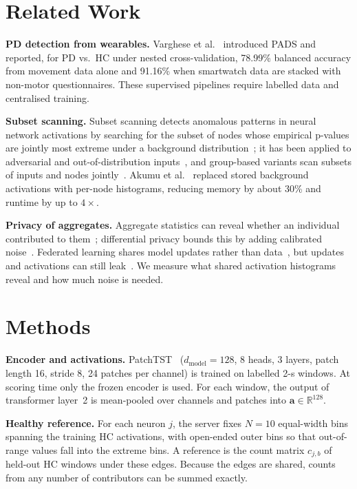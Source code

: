 \documentclass{article}
\begin{document}
\section{Related Work}
\label{sec:related}

\textbf{PD detection from wearables.} Varghese et al.~\cite{varghese2024pads} introduced PADS and reported, for PD vs.\ HC under nested cross-validation, 78.99\% balanced accuracy from movement data alone and 91.16\% when smartwatch data are stacked with non-motor questionnaires. These supervised pipelines require labelled data and centralised training.

\textbf{Subset scanning.} Subset scanning detects anomalous patterns in neural network activations by searching for the subset of nodes whose empirical p-values are jointly most extreme under a background distribution~\cite{mcfowland2013fgss, speakman2018subset}; it has been applied to adversarial and out-of-distribution inputs~\cite{cintas2020detecting, akinwande2020audio}, and group-based variants scan subsets of inputs and nodes jointly~\cite{cintas2022group}. Akumu et al.~\cite{akumu2023deepscan} replaced stored background activations with per-node histograms, reducing memory by about 30\% and runtime by up to $4\times$.

\textbf{Privacy of aggregates.} Aggregate statistics can reveal whether an individual contributed to them~\cite{homer2008resolving, shokri2017membership}; differential privacy bounds this by adding calibrated noise~\cite{dwork2006calibrating}. Federated learning shares model updates rather than data~\cite{antunes2022fl}, but updates and activations can still leak~\cite{hitaj2017gan, dai2025stealing}. We measure what shared activation histograms reveal and how much noise is needed.

\section{Methods}
\label{sec:methods}

\textbf{Encoder and activations.} PatchTST~\cite{nie2023patchtst} ($d_{\text{model}}{=}128$, 8 heads, 3 layers, patch length 16, stride 8, 24 patches per channel) is trained on labelled 2-s windows. At scoring time only the frozen encoder is used. For each window, the output of transformer layer~2 is mean-pooled over channels and patches into $\mathbf{a} \in \mathbb{R}^{128}$.

\textbf{Healthy reference.} For each neuron $j$, the server fixes $N{=}10$ equal-width bins spanning the training HC activations, with open-ended outer bins so that out-of-range values fall into the extreme bins. A reference is the count matrix $c_{j,b}$ of held-out HC windows under these edges. Because the edges are shared, counts from any number of contributors can be summed exactly.
\end{document}
